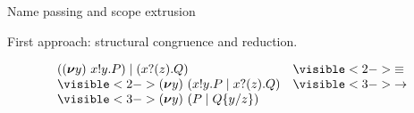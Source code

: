 \documentclass[aspectratio=169,hyperref={pdfpagelabels=false}]{beamer}
\begin{document}
\begin{frame}{Name passing and scope extrusion}

  First approach: structural congruence and reduction.\ \\

  \begin{footnotesize}
  \[
  \begin{array}{ll}
    \Ppar{(\Pres{y}{\Pout{x}{y}{P}})}{(\Pin{x}{z}{Q})} & \visible<2->{\equiv}\\
    \visible<2->{\Pres{y}{ (\Ppar{\Pout{x}{y}{P}}{\Pin{x}{z}{Q}})}} & \visible<3->{\rightarrow}\\
    \visible<3->{\Pres{y}{(\Ppar{P}{\subst{Q}{y}{z}})}} & %
  \end{array}
  \]
  \end{footnotesize}
  \ \\ \ \\
\begin{footnotesize}
\end{footnotesize}      
\end{frame}

\newcommand{\hg}[1]{\colorbox{mygreen}{$\displaystyle #1$}}
\newcommand{\hr}[1]{\colorbox{myred}{$\displaystyle #1$}}
\end{document}
